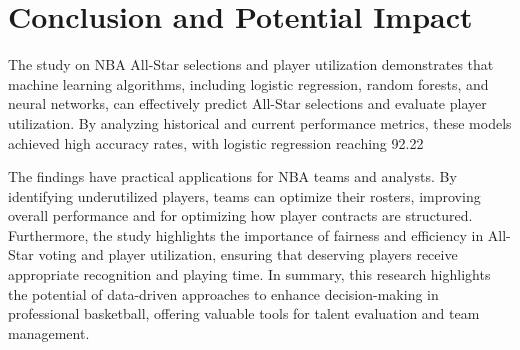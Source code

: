 \documentclass[12pt]{article}
\begin{document}
\section{Conclusion and Potential Impact}
The study on NBA All-Star selections and player utilization demonstrates that machine learning algorithms, including logistic regression, random forests, and neural networks, can effectively predict All-Star selections and evaluate player utilization. By analyzing historical and current performance metrics, these models achieved high accuracy rates, with logistic regression reaching 92.22%

The findings have practical applications for NBA teams and analysts. By identifying underutilized players, teams can optimize their rosters, improving overall performance and for optimizing how player contracts are structured. Furthermore, the study highlights the importance of fairness and efficiency in All-Star voting and player utilization, ensuring that deserving players receive appropriate recognition and playing time.
In summary, this research highlights the potential of data-driven approaches to enhance decision-making in professional basketball, offering valuable tools for talent evaluation and team management.
\end{document}
